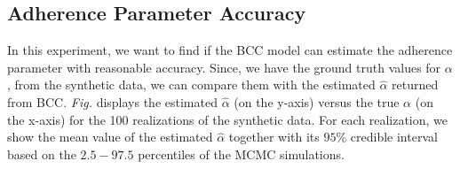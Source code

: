 \subsection{Adherence Parameter Accuracy } \label{integr-synth-alpha-sect}
In this experiment, we want to find if the BCC model can estimate the adherence parameter with reasonable accuracy. Since, we have the ground truth values for $\alpha$, from the synthetic data, we can compare them with the estimated $\hat{\alpha}$ returned from BCC. \emph{Fig. } displays the estimated $\hat{\alpha}$ (on the y-axis) versus the true $\alpha$ (on the x-axis) for the 100 realizations of the synthetic data. For each realization, we show the mean value of the estimated $\hat{\alpha}$ together with its $95$\% credible interval based on the $2.5 - 97.5$ percentiles of the MCMC simulations. 